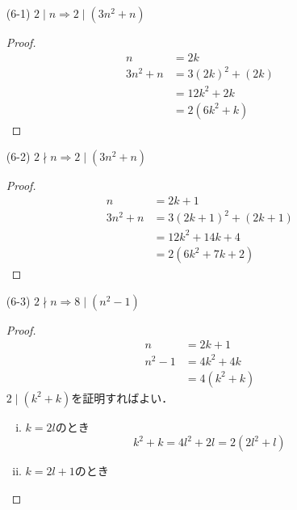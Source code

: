 \documentclass[a4paper,12pt]{ltjsarticle}
\begin{document}
\begin{enumerate}[(1)]
\begin{proof}
            \begin{align*}
                5n^2 &= 2k \\
                3n^3 &= 2kn - 2n^3 \\
                &= 2(kn - n^3)
            \end{align*}
        \end{proof}
    \item[(6-1)] $2 \mid n \Rightarrow 2 \mid (3n^2 + n)$
        \begin{proof}
            \begin{align*}
                n &= 2k \\
                3n^2 + n &= 3(2k)^2 + (2k) \\
                &= 12k^2 + 2k \\
                &= 2(6k^2 + k)
            \end{align*}
        \end{proof}
    \item[(6-2)] $2 \nmid n \Rightarrow 2 \mid (3n^2 + n)$
        \begin{proof}
            \begin{align*}
                n &= 2k + 1 \\
                3n^2 + n &= 3(2k + 1)^2 + (2k + 1) \\
                &= 12k^2 + 14k + 4 \\
                &= 2(6k^2 + 7k + 2)
            \end{align*}
        \end{proof}
    \item[(6-3)] $2 \nmid n \Rightarrow 8 \mid (n^2 - 1)$
        \begin{proof}
            \begin{align*}
                n &= 2k + 1 \\
                n^2 - 1 &= 4k^2 + 4k \\
                &= 4(k^2 + k)
            \end{align*}
            $2 \mid (k^2 + k)$を証明すればよい．
            \begin{enumerate}[(i)]
                \item $k = 2l$のとき
                    \begin{equation*}
                        k^2 + k = 4l^2 + 2l = 2(2l^2 + l)
                    \end{equation*}
                \item $k = 2l + 1$のとき
                    \begin{equation*}

\end{equation*}
\end{enumerate}
\end{proof}
\end{enumerate}
\end{document}
